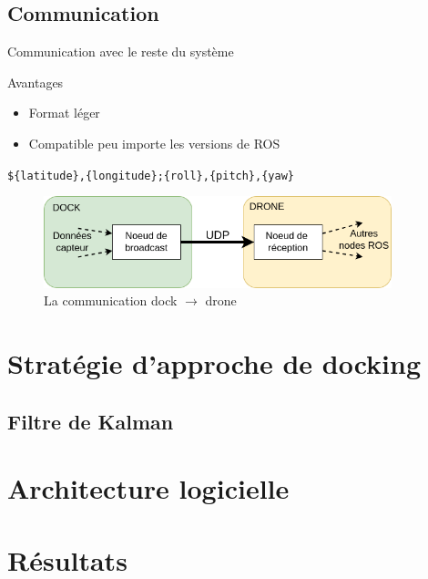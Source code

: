 \documentclass[pdftex,beamer,aspectratio=169]{beamer}
\theoremstyle{definition}
\theoremstyle{example}
\theoremstyle{plain}
\begin{document}
\subsection{Communication}

\begin{frame}[fragile]{Communication avec le reste du système}
  \centering
  \begin{minipage}{0.3\textwidth}
    \begin{exampleblock}{Avantages}
      \begin{itemize}
        \item Format léger
        \item Compatible peu importe les versions de ROS
      \end{itemize}
    \end{exampleblock}
  \end{minipage}
  \begin{minipage}{0.69\textwidth}
    \verb|${latitude},{longitude};{roll},{pitch},{yaw}|
  
    \begin{figure}[H]
      \centering
      \includegraphics[width=0.9\textwidth]{UDP_connexion.png}
      \caption{La communication dock $\rightarrow$ drone}
  \end{figure}

  \end{minipage}
\end{frame}

\section{Stratégie d'approche de docking}

\subsection{Filtre de Kalman}


\section{Architecture logicielle}


\section{Résultats}
\end{document}
